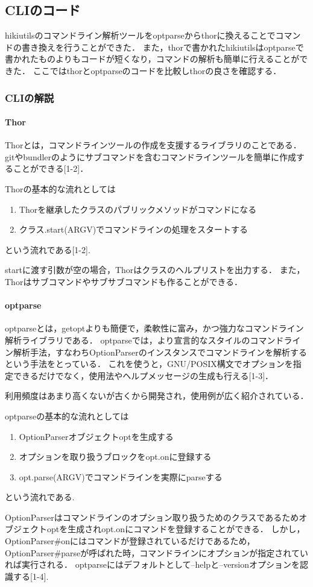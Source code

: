 
\subsection{CLIのコード}
hikiutilsのコマンドライン解析ツールをoptparseからthorに換えることでコマンドの書き換えを行うことができた．
また，thorで書かれたhikiutilsはoptparseで書かれたものよりもコードが短くなり，コマンドの解析も簡単に行えることができた．
ここではthorとoptparseのコードを比較しthorの良さを確認する．

\subsubsection{CLIの解説}
\paragraph{Thor}
Thorとは，コマンドラインツールの作成を支援するライブラリのことである．
gitやbundlerのようにサブコマンドを含むコマンドラインツールを簡単に作成することができる[1-2]．

Thorの基本的な流れとしては

\begin{enumerate}
\item Thorを継承したクラスのパブリックメソッドがコマンドになる
\item クラス.start(ARGV)でコマンドラインの処理をスタートする
\end{enumerate}
という流れである[1-2].

startに渡す引数が空の場合，Thorはクラスのヘルプリストを出力する．
また，Thorはサブコマンドやサブサブコマンドも作ることができる．

\paragraph{optparse}
optparseとは，getoptよりも簡便で，柔軟性に富み，かつ強力なコマンドライン解析ライブラリである．
optparseでは，より宣言的なスタイルのコマンドライン解析手法，すなわちOptionParserのインスタンスでコマンドラインを解析するという手法をとっている．
これを使うと，GNU/POSIX構文でオプションを指定できるだけでなく，使用法やヘルプメッセージの生成も行える[1-3]．

利用頻度はあまり高くないが古くから開発され，使用例が広く紹介されている．

optparseの基本的な流れとしては

\begin{enumerate}
\item OptionParserオブジェクトoptを生成する
\item オプションを取り扱うブロックをopt.onに登録する
\item opt.parse(ARGV)でコマンドラインを実際にparseする
\end{enumerate}
という流れである.

OptionParserはコマンドラインのオプション取り扱うためのクラスであるためオブジェクトoptを生成されopt.onにコマンドを登録することができる．
しかし，OptionParser\#onにはコマンドが登録されているだけであるため，OptionParser\#parseが呼ばれた時，コマンドラインにオプションが指定されていれば実行される．
optparseにはデフォルトとして--helpと--versionオプションを認識する[1-4].

